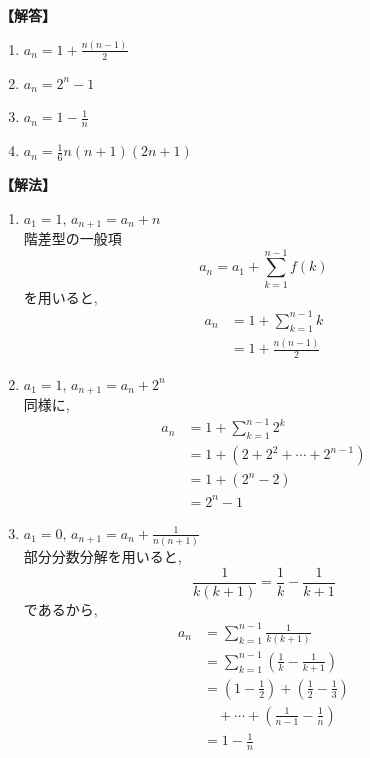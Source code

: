     \noindent\textbf{【解答】}
    \begin{enumerate}[label=(\arabic*),parsep=3pt]
      \item $\displaystyle a_n=1+\frac{n(n-1)}{2}$
      \item $\displaystyle a_n=2^n-1$
      \item $\displaystyle a_n=1-\frac{1}{n}$
      \item $\displaystyle a_n=\frac{1}{6}n(n+1)(2n+1)$
    \end{enumerate}

    \noindent\textbf{【解法】}
    \begin{enumerate}[label=(\arabic*),parsep=3pt]
      \item $\displaystyle a_1=1,\,a_{n+1}=a_n+n$\\
            階差型の一般項
            \[
              a_n=a_1+\sum_{k=1}^{n-1}f(k)
            \]
            を用いると,
            \begin{align*}
              a_n
                &=1+\sum_{k=1}^{n-1}k\\
                &=1+\frac{n(n-1)}{2}
            \end{align*}

      \item $\displaystyle a_1=1,\,a_{n+1}=a_n+2^n$\\
            同様に,
            \begin{align*}
              a_n
                &=1+\sum_{k=1}^{n-1}2^k\\
                &=1+(2+2^2+\cdots+2^{n-1})\\
                &=1+(2^n-2)\\
                &=2^n-1
            \end{align*}

      \item $\displaystyle a_1=0,\,a_{n+1}=a_n+\frac{1}{n(n+1)}$\\
            部分分数分解を用いると,
            \[
              \frac{1}{k(k+1)}
              =\frac{1}{k}-\frac{1}{k+1}
            \]
            であるから,
            \begin{align*}
              a_n
                &=\sum_{k=1}^{n-1}\frac{1}{k(k+1)}\\
                &=\sum_{k=1}^{n-1}
                  \left(\frac{1}{k}-\frac{1}{k+1}\right)\\
                &=\left(1-\frac12\right)
                  +\left(\frac12-\frac13\right)\\
                &\quad +\cdots+\left(\frac{1}{n-1}-\frac1n\right)\\
                &=1-\frac1n
            \end{align*}


\end{enumerate}
